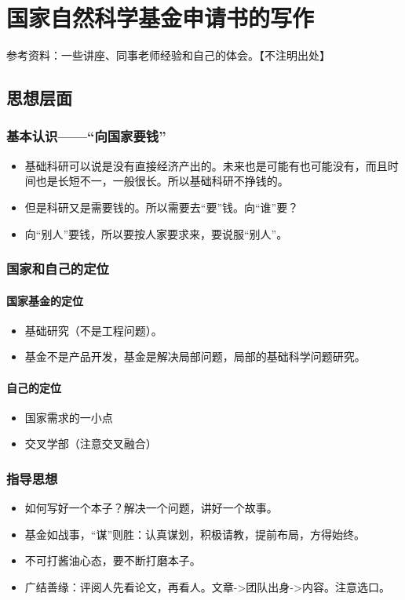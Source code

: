 \section{国家自然科学基金申请书的写作}
参考资料：一些讲座、同事老师经验和自己的体会。【不注明出处】
\subsection{思想层面}
\subsubsection{基本认识——“向国家要钱”}
\begin{itemize}
\item 基础科研可以说是没有直接经济产出的。未来也是可能有也可能没有，而且时间也是长短不一，一般很长。所以基础科研不挣钱的。
\item 但是科研又是需要钱的。所以需要去“要”钱。向“谁”要？
\item 向“别人”要钱，所以要按人家要求来，要说服“别人”。
\end{itemize}


\subsubsection{国家和自己的定位}
\paragraph{国家基金的定位}
\begin{itemize}
\item 基础研究（不是工程问题）。
\item 基金不是产品开发，基金是解决局部问题，局部的基础科学问题研究。
\end{itemize}

\paragraph{自己的定位}
\begin{itemize}
\item 国家需求的一小点
\item 交叉学部（注意交叉融合）
\end{itemize}


\subsubsection{指导思想}
\begin{itemize}
\item 如何写好一个本子？解决一个问题，讲好一个故事。

\item 基金如战事，“谋”则胜：认真谋划，积极请教，提前布局，方得始终。

\item 不可打酱油心态，要不断打磨本子。

\item 广结善缘：评阅人先看论文，再看人。文章->团队出身->内容。注意选口。
\end{itemize}


